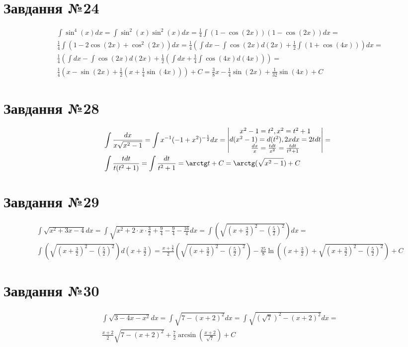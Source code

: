 \documentclass{report}
\begin{document}
\section{Завдання №24}
\begin{equation}\label{eq24}\begin{split}
	& \int \sin^4(x)dx = \int \sin^2(x)\sin^2(x)dx = \frac{1}{4}\int(1 - \cos(2x))(1 - \cos(2x))dx =\\
	& \frac{1}{4}\int(1 - 2\cos(2x) + \cos^2(2x))dx = \frac{1}{4}(\int dx - \int\cos(2x)d(2x) + \frac{1}{2}\int(1 + \cos(4x)))dx =\\
	& \frac{1}{4}(\int dx - \int\cos(2x)d(2x) + \frac{1}{2}(\int dx + \frac{1}{4}\int\cos(4x)d(4x))) =\\
	& \frac{1}{4}(x - \sin(2x) + \frac{1}{2}(x + \frac{1}{4}\sin(4x))) + C = \frac{3}{8}x - \frac{1}{4}\sin(2x) + \frac{1}{32}\sin(4x) + C
\end{split}\end{equation}

\section{Завдання №28}
\begin{equation}\label{eq28}\begin{split}
	& \int \frac{dx}{x\sqrt{x^2 - 1}} = \int x^{-1}(-1 + x^2)^{-\frac{1}{2}}dx = \begin{vmatrix}x^2 - 1= t^2, x^2 = t^2 + 1\\d(x^2 - 1) = d(t^2), 2xdx = 2tdt\\\frac{dx}{x} = \frac{tdt}{x^2} = \frac{tdt}{t^2 + 1}\end{vmatrix} =\\
	& \int\frac{tdt}{t(t^2 + 1)} = \int\frac{dt}{t^2 + 1} = \arctg t + C = \arctg(\sqrt{x^2 - 1}) + C
\end{split}
\end{equation}

\section{Завдання №29}
\begin{equation}\label{eq29}\begin{split}
	& \int\sqrt{x^2 + 3x - 4}dx = \int\sqrt{x^2 + 2\cdot x\cdot\frac{3}{2} + \frac{9}{4} - \frac{9}{4} - \frac{16}{4}}dx = \int(\sqrt{(x + \frac{3}{2})^2 - (\frac{5}{2})^2}) dx =\\
	& \int(\sqrt{(x + \frac{3}{2})^2 - (\frac{5}{2})^2}) d(x+\frac{3}{2}) = \frac{x + \frac{3}{2}}{2}(\sqrt{(x + \frac{3}{2})^2 - (\frac{5}{2})^2}) - \frac{25}{8}\ln\left((x + \frac{3}{2}) + \sqrt{(x + \frac{3}{2})^2 - (\frac{5}{2})^2}\right) + C
\end{split}\end{equation}

\section{Завдання №30}
\begin{equation}\label{eq30}\begin{split}
	& \int\sqrt{3 - 4x - x^2}dx = \int\sqrt{7 - (x + 2)^2}dx = \int\sqrt{(\sqrt{7})^2 - (x + 2)^2}dx =\\
	& \frac{x + 2}{2}\sqrt{7 - (x + 2)^2} + \frac{7}{2}\arcsin\left(\frac{x + 2}{\sqrt{7}}\right) + C
\end{split}\end{equation}
\end{document}
